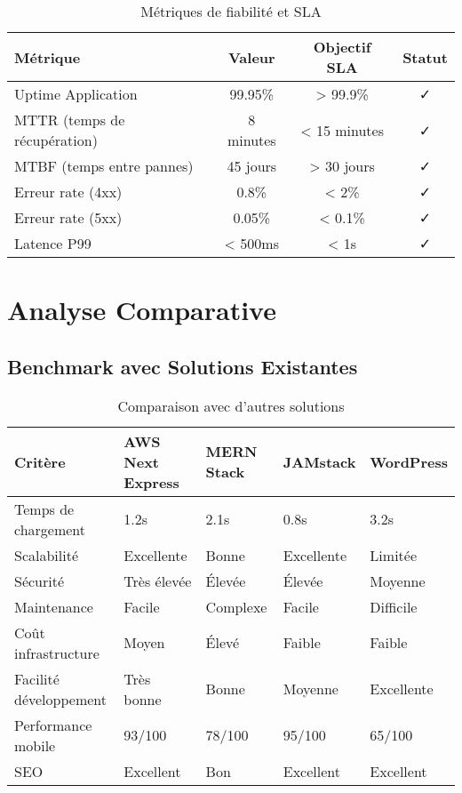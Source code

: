 \begin{table}[H]
    \centering
    \begin{tabularx}{\textwidth}{|l|c|c|c|}
        \hline
        \textbf{Métrique} & \textbf{Valeur} & \textbf{Objectif SLA} & \textbf{Statut} \\
        \hline
        Uptime Application & 99.95\% & > 99.9\% & ✓ \\
        \hline
        MTTR (temps de récupération) & 8 minutes & < 15 minutes & ✓ \\
        \hline
        MTBF (temps entre pannes) & 45 jours & > 30 jours & ✓ \\
        \hline
        Erreur rate (4xx) & 0.8\% & < 2\% & ✓ \\
        \hline
        Erreur rate (5xx) & 0.05\% & < 0.1\% & ✓ \\
        \hline
        Latence P99 & < 500ms & < 1s & ✓ \\
        \hline
    \end{tabularx}
    \caption{Métriques de fiabilité et SLA}
    \label{tab:reliability_metrics}
\end{table}

\section{Analyse Comparative}

\subsection{Benchmark avec Solutions Existantes}

\begin{table}[H]
    \centering
    \begin{tabularx}{\textwidth}{|l|X|X|X|X|}
        \hline
        \textbf{Critère} & \textbf{AWS Next Express} & \textbf{MERN Stack} & \textbf{JAMstack} & \textbf{WordPress} \\
        \hline
        Temps de chargement & 1.2s & 2.1s & 0.8s & 3.2s \\
        \hline
        Scalabilité & Excellente & Bonne & Excellente & Limitée \\
        \hline
        Sécurité & Très élevée & Élevée & Élevée & Moyenne \\
        \hline
        Maintenance & Facile & Complexe & Facile & Difficile \\
        \hline
        Coût infrastructure & Moyen & Élevé & Faible & Faible \\
        \hline
        Facilité développement & Très bonne & Bonne & Moyenne & Excellente \\
        \hline
        Performance mobile & 93/100 & 78/100 & 95/100 & 65/100 \\
        \hline
        SEO & Excellent & Bon & Excellent & Excellent \\
        \hline
    \end{tabularx}
    \caption{Comparaison avec d'autres solutions}
    \label{tab:solution_comparison}
\end{table}

